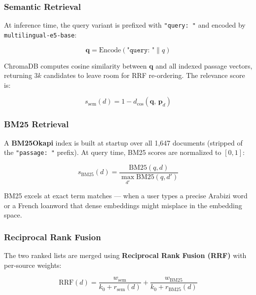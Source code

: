 \subsubsection{Semantic Retrieval}

At inference time, the query variant is prefixed with \texttt{"query: "} and encoded
by \texttt{multilingual-e5-base}:

\begin{equation}
    \mathbf{q} = \text{Encode}\!\left(\texttt{"query: "} \| q\right)
    \label{eq:query_encode}
\end{equation}

ChromaDB computes cosine similarity between $\mathbf{q}$ and all indexed passage
vectors, returning $3k$ candidates to leave room for RRF re-ordering. The relevance
score is:

\begin{equation}
    s_{\text{sem}}(d) = 1 - d_{\cos}(\mathbf{q},\, \mathbf{p}_d)
    \label{eq:sem_score}
\end{equation}

\subsubsection{BM25 Retrieval}

A \textbf{BM25Okapi} index is built at startup over all 1,647 documents (stripped of
the \texttt{"passage: "} prefix). At query time, BM25 scores are normalized to $[0,1]$:

\begin{equation}
    s_{\text{BM25}}(d) = \frac{\text{BM25}(q, d)}{\max_{d'} \text{BM25}(q, d')}
    \label{eq:bm25_score}
\end{equation}

BM25 excels at exact term matches --- when a user types a precise Arabizi word or a
French loanword that dense embeddings might misplace in the embedding space.

\subsubsection{Reciprocal Rank Fusion}

The two ranked lists are merged using \textbf{Reciprocal Rank Fusion (RRF)} with
per-source weights:

\begin{equation}
    \text{RRF}(d) = \frac{w_{\text{sem}}}{k_0 + r_{\text{sem}}(d)}
                  + \frac{w_{\text{BM25}}}{k_0 + r_{\text{BM25}}(d)}
    \label{eq:rrf}
\end{equation}

